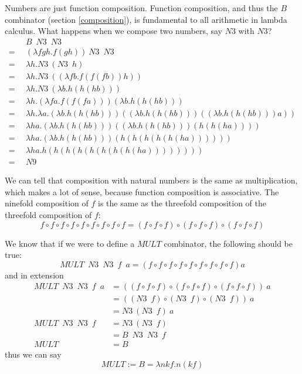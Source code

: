 \documentclass[11pt]{article}
\begin{document}
Numbers are just function composition. Function composition, and thus the \(B\)
combinator (section \ref{composition}), is fundamental to all arithmetic in
lambda calculus. What happens when we compose two numbers, say \(N3\) with
\(N3\)?
\begin{align*}
	&\enspace B\enspace N3\enspace N3\\
	=&\enspace(\lambda fgh.f(gh))\:N3\enspace N3\\
	=&\enspace\lambda h.N3\:(N3\enspace h)\\
	=&\enspace\lambda h.N3\:((\lambda fb.f(f(fb))h))\\
	=&\enspace\lambda h.N3\:(\lambda b.h(h(hb)))\\
	=&\enspace\lambda h.(\lambda fa.f(f(fa)))(\lambda b.h(h(hb)))\\
	=&\enspace\lambda h.\lambda a.
		(\lambda b.h(h(hb)))((\lambda b.h(h(hb)))((\lambda b.h(h(hb)))a))\\
	=&\enspace\lambda ha.(\lambda b.h(h(hb)))((\lambda b.h(h(hb)))(h(h(ha))))\\
	=&\enspace\lambda ha.(\lambda b.h(h(hb)))(h(h(h(h(h(ha))))))\\
	=&\enspace\lambda ha.h(h(h(h(h(h(h(h(ha))))))))\\
	=&\enspace N9
\end{align*}


We can tell that composition with natural numbers is the same as
multiplication, which makes a lot of sense, because function composition is
associative. The ninefold composition of \(f\) is the same as the threefold
composition of the threefold composition of \(f\):
\[
	f\circ f\circ f\circ f\circ f\circ f\circ f\circ f\circ f
	= (f\circ f\circ f) \circ (f\circ f\circ f) \circ (f\circ f\circ f) 
\]

We know that if we were to define a \(MULT\) combinator, the following should
be true:
\[
	MULT\enspace N3\enspace N3\enspace f\enspace a
		=(f\circ f\circ f\circ f\circ f\circ f\circ f\circ f\circ f)a
\]
and in extension
\begin{align*}
	MULT\enspace N3\enspace N3\enspace f\enspace a
		&=((f\circ f\circ f)\circ(f\circ f\circ f)\circ(f\circ f\circ f))\:a\\
		&=((N3\enspace f)\circ (N3\enspace f)\circ (N3\enspace f))\:a\\
		&=N3\:(N3\enspace f)\:a\\
	MULT\enspace N3\enspace N3\enspace f\enspace
		&=N3\:(N3\enspace f)\\
		&=B\enspace N3\enspace N3\enspace f\\
	MULT&=B
\end{align*}
thus we can say
\[MULT:=B=\lambda nkf.n(kf)\]
\end{document}
